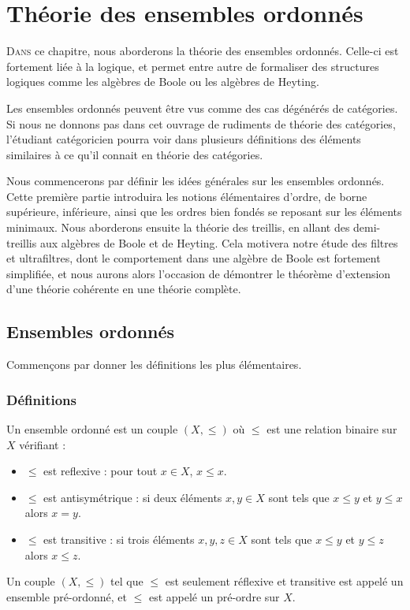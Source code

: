 \chapter{Théorie des ensembles ordonnés}
\label{chp.ordres}

\minitoc

\lettrine{D}{ans} ce chapitre, nous aborderons la théorie des ensembles
ordonnés. Celle-ci est fortement liée à la logique, et permet entre autre de
formaliser des structures logiques comme les algèbres de Boole ou les algèbres
de Heyting. 

Les ensembles ordonnés peuvent être vus comme des cas dégénérés de catégories.
Si nous ne donnons pas dans cet ouvrage de rudiments de théorie des catégories,
l'étudiant catégoricien pourra voir dans plusieurs définitions des éléments
similaires à ce qu'il connait en théorie des catégories.

Nous commencerons par définir les idées générales sur les ensembles ordonnés.
Cette première partie introduira les notions élémentaires d'ordre, de borne
supérieure, inférieure, ainsi que les ordres bien fondés se reposant sur les
éléments minimaux.
Nous aborderons ensuite la théorie des treillis, en allant des demi-treillis aux
algèbres de Boole et de Heyting.
Cela motivera notre étude des filtres et ultrafiltres, dont le comportement dans
une algèbre de Boole est fortement simplifiée, et nous aurons alors l'occasion
de démontrer le théorème d'extension d'une théorie cohérente en une théorie
complète.

\section{Ensembles ordonnés}

Commençons par donner les définitions les plus élémentaires.

\subsection{Définitions}

\begin{definition}
  Un ensemble ordonné est un couple $(X,\leq)$ où $\leq$ est une relation
  binaire sur $X$ vérifiant :
  \begin{itemize}
  \item $\leq$ est reflexive : pour tout $x\in X$, $x\leq x$.
  \item $\leq$ est antisymétrique : si deux éléments $x,y\in X$ sont tels que
    $x\leq y$ et $y\leq x$ alors $x = y$.
  \item $\leq$ est transitive : si trois éléments $x,y,z\in X$ sont tels que
    $x\leq y$ et $y\leq z$ alors $x\leq z$.
  \end{itemize}

  Un couple $(X,\leq)$ tel que $\leq$ est seulement réflexive et transitive est
  appelé un ensemble pré-ordonné, et $\leq$ est appelé un pré-ordre sur $X$.
\end{definition}

